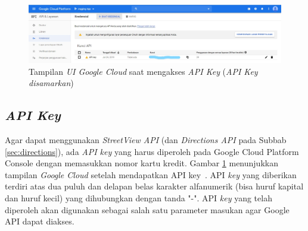 \begin{figure}[h]
	\centering
		\includegraphics[width=6in]{Gambar/google_cloud.png}
	\caption{Tampilan \textit{UI Google Cloud} saat mengakses \textit{API Key} (\textit{API Key disamarkan})}
	\label{fig:googlecloud}
\end{figure}

\subsection{{\it API Key}}
\label{subs:api-key}
Agar dapat menggunakan {\it StreetView API} (dan \textit{Directions API} pada Subbab \ref{sec:directions}), ada {\it API key} yang harus diperoleh pada Google Cloud Platform Console dengan memasukkan nomor kartu kredit. Gambar \ref{fig:googlecloud} menunjukkan tampilan \textit{Google Cloud} setelah mendapatkan API key~\cite{api-key}. API {\it key} yang diberikan terdiri atas dua puluh dan delapan belas karakter alfanumerik (bisa huruf kapital dan huruf kecil) yang dihubungkan dengan tanda "-". API {\it key} yang telah diperoleh akan digunakan sebagai salah satu parameter masukan agar Google API dapat diakses.


